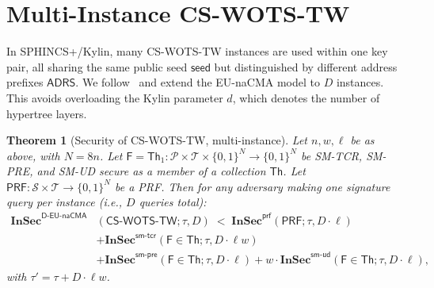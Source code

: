 \documentclass[11pt,a4paper]{article}
\newtheorem{theorem}{Theorem}[section]
\newcommand{\F}{\mathsf{F}}
\newcommand{\Th}{\mathsf{Th}}
\newcommand{\bits}{\{0,1\}}
\newcommand{\seed}{\mathsf{seed}}
\newcommand{\ADRS}{\mathsf{ADRS}}
\newcommand{\PRF}{\mathsf{PRF}}
\newcommand{\InSec}[1]{\mathbf{InSec}^{\mathsf{#1}}}
\newcommand{\Nbits}{N}
\begin{document}
\section{Multi-Instance CS-WOTS-TW}
\label{sec:wotstw-multi}

In SPHINCS+/Kylin, many CS-WOTS-TW instances are used within one key pair, all sharing the same public seed $\seed$ but distinguished by different address prefixes $\ADRS$. We follow~\cite[Section~6]{HK22} and extend the EU-naCMA model to $D$ instances. This avoids overloading the Kylin parameter $d$, which denotes the number of hypertree layers.

\begin{theorem}[Security of CS-WOTS-TW, multi-instance]
\label{thm:wots-tw-d}
Let $n,w,\ell$ be as above, with $\Nbits=8n$. Let $\F = \Th_1 : \mathcal{P} \times \mathcal{T} \times \bits^\Nbits \to \bits^\Nbits$ be SM-TCR, SM-PRE, and SM-UD secure as a member of a collection $\boldsymbol{\Th}$. Let $\PRF : \mathcal{S} \times \mathcal{T} \to \bits^\Nbits$ be a PRF. Then for any adversary making one signature query per instance (i.e., $D$ queries total):
\begin{align*}
\InSec{D\text{-}EU\text{-}naCMA}&(\mathsf{CS\text{-}WOTS\text{-}TW}; \tau, D) \;<\;
\InSec{prf}(\PRF; \tau, D\!\cdot\!\ell) \\
&+ \InSec{sm\text{-}tcr}(\F \in \boldsymbol{\Th}; \tau, D\!\cdot\!\ell w) \\
&+ \InSec{sm\text{-}pre}(\F \in \boldsymbol{\Th}; \tau, D\!\cdot\!\ell)
+ w \cdot \InSec{sm\text{-}ud}(\F \in \boldsymbol{\Th}; \tau, D\!\cdot\!\ell),
\end{align*}
with $\tau' = \tau + D \cdot \ell w$.
\end{theorem}
\end{document}
